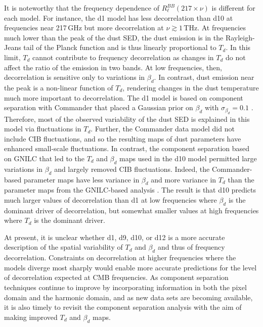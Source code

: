 \documentclass[twocolumn]{aastex631}
\begin{document}
It is noteworthy that the frequency dependence of $R_\ell^{BB}(217\times\nu)$ is different for each model. For instance, the d1 model has less decorrelation than d10 at frequencies near 217\,GHz but more decorrelation at $\nu \gtrsim 1$\,THz. At frequencies much lower than the peak of the dust SED, the dust emission is in the Rayleigh-Jeans tail of the Planck function and is thus linearly proportional to $T_d$. In this limit, $T_d$ cannot contribute to frequency decorrelation as changes in $T_d$ do not affect the ratio of the emission in two bands. At low frequencies, then, decorrelation is sensitive only to variations in $\beta_d$. In contrast, dust emission near the peak is a non-linear function of $T_d$, rendering changes in the dust temperature much more important to decorrelation. The d1 model is based on component separation with Commander that placed a Gaussian prior on $\beta_d$ with $\sigma_{\beta_d} = 0.1$ \citep{planck2014-a12}. Therefore, most of the observed variability of the dust SED is explained in this model via fluctuations in $T_d$. Further, the Commander data model did not include CIB fluctuations, and so the resulting maps of dust parameters have enhanced small-scale fluctuations. In contrast, the component separation based on GNILC that led to the $T_d$ and $\beta_d$ maps used in the d10 model \citep{planck2016-XLVIII} permitted large variations in $\beta_d$ and largely removed CIB fluctuations. Indeed, the Commander-based parameter maps have less variance in $\beta_d$ and more variance in $T_d$ than the parameter maps from the GNILC-based analysis \citep[see][Table~1]{planck2016-XLVIII}. The result is that d10 predicts much larger values of decorrelation than d1 at low frequencies where $\beta_d$ is the dominant driver of decorrelation, but somewhat smaller values at high frequencies where $T_d$ is the dominant driver.

At present, it is unclear whether d1, d9, d10, or d12 is a more accurate description of the spatial variability of $T_d$ and $\beta_d$ and thus of frequency decorrelation. Constraints on decorrelation at higher frequencies where the models diverge most sharply would enable more accurate predictions for the level of decorrelation expected at CMB frequencies. As component separation techniques continue to improve by incorporating information in both the pixel domain and the harmonic domain, and as new data sets are becoming available, it is also timely to revisit the component separation analysis with the aim of making improved $T_d$ and $\beta_d$ maps.
\end{document}
